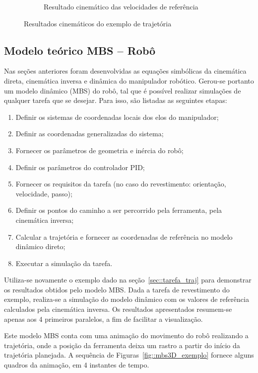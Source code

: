 \begin{figure}[h]
\begin{subfigure}[b]{0.45\textwidth}
        \caption{Resultado cinemático das velocidades de referência}
        \label{fig::uxt_exemplo}
    \end{subfigure}
    \caption{Resultados cinemáticos do exemplo de
    trajetória}\label{fig::res_exemplo}
\end{figure}


\subsection{Modelo teórico MBS -- Robô}

Nas seções anteriores foram desenvolvidas as equações simbólicas da
cinemática direta, cinemática inversa e dinâmica do manipulador robótico. 
Gerou-se portanto um modelo dinâmico (MBS) do robô, tal que é
possível realizar simulações de qualquer tarefa que se desejar. Para isso, são
listadas as seguintes etapas:

\begin{enumerate}
  \item Definir os sistemas de coordenadas locais dos elos do manipulador;
  \item Definir as coordenadas generalizadas do sistema;
  \item Fornecer os parâmetros de geometria e inércia do robô;
  \item Definir os parâmetros do controlador PID;
  \item Fornecer os requisitos da tarefa (no caso do revestimento: orientação,
  velocidade, passo);
  \item Definir os pontos do caminho a ser percorrido pela ferramenta, pela
  cinemática inversa;
  \item Calcular a trajetória e fornecer as coordenadas de referência no
  modelo dinâmico direto;
  \item Executar a simulação da tarefa. 
\end{enumerate}

Utiliza-se novamente o exemplo dado na seção~\ref{sec::tarefa_traj} para
demonstrar os resultados obtidos pelo modelo MBS. Dada a tarefa de revestimento
do exemplo, realiza-se a simulação do modelo dinâmico com os valores de
referência calculados pela cinemática inversa.  Os resultados apresentados
resumem-se apenas aos 4 primeiros paralelos, a fim de facilitar a visualização.

Este modelo MBS conta com uma animação do movimento do robô realizando a
trajetória, onde a posição da ferramenta deixa um rastro a partir do início da
trajetória planejada. A sequência de Figuras~\ref{fig::mbs3D_exemplo} fornece
alguns quadros da animação, em 4 instantes de tempo.

